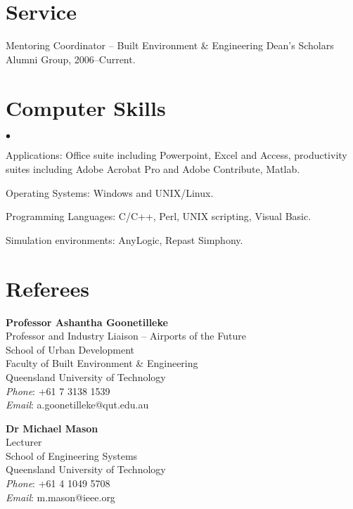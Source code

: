 \documentclass[margin,line]{resume}
\newenvironment{list2}{
  \begin{list}{$\bullet$}{%
      \setlength{\itemsep}{0in}
      \setlength{\parsep}{0in} \setlength{\parskip}{0in}
      \setlength{\topsep}{0in} \setlength{\partopsep}{0in}
      \setlength{\leftmargin}{0.2in}}}{\end{list}}
\begin{document}
\begin{resume}
\section{\sc Service}
{ Mentoring Coordinator -- Built Environment \&
Engineering Dean's Scholars Alumni Group, 2006--Current. }%

\section{\sc Computer Skills}
\begin{list2}
\item Applications: Office suite including
    Powerpoint, Excel and Access, productivity suites including Adobe Acrobat Pro and Adobe Contribute, Matlab. %
\item Operating Systems: Windows and UNIX/Linux.
\item Programming Languages: C/C++, Perl, UNIX scripting, Visual Basic.
\item Simulation environments: AnyLogic, Repast Simphony.
\end{list2}
\vspace{1.85\baselineskip}
\newpage
\section{\sc Referees}
{

{\bf Professor Ashantha Goonetilleke} \\
Professor and Industry Liaison -- Airports of the Future \\
School of Urban Development \\
Faculty of Built Environment \& Engineering \\
Queensland University of Technology\\
{\it Phone}: +61 7 3138 1539    \\
{\it Email}: a.goonetilleke@qut.edu.au

{\bf Dr Michael Mason} \\
Lecturer \\
School of Engineering Systems\\
Queensland University of Technology\\
{\it Phone}: +61 4 1049 5708    \\
{\it Email}: m.mason@ieee.org

}
\end{resume}
\end{document}
